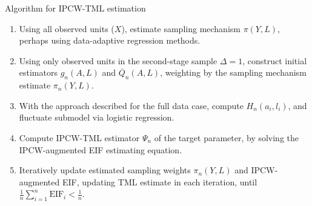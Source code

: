 \documentclass{beamer}
\begin{document}
\begin{frame}[c]{Algorithm for IPCW-TML estimation}

\begin{center}
\begin{enumerate}\label{ipcwtmle_algo}
  \itemsep8pt
  \item Using all observed units ($X$), estimate sampling mechanism
    $\pi(Y, L)$, perhaps using data-adaptive regression methods.
  \item Using only observed units in the second-stage sample $\Delta = 1$,
    construct initial estimators $g_n(A,L)$ and $\overline{Q}_n(A,L)$,
    weighting by the sampling mechanism estimate $\pi_n(Y,L)$.
  \item With the approach described for the full data case, compute
    $H_n(a_i,l_i)$, and fluctuate submodel via logistic regression.
  \item Compute IPCW-TML estimator $\Psi_n$ of the target parameter, by solving
    the IPCW-augmented EIF estimating equation.
  \item Iteratively update estimated sampling weights $\pi_n(Y,L)$ and
    IPCW-augmented EIF, updating TML estimate in each iteration, until
    $\frac{1}{n}\sum_{i = 1}^n \text{EIF}_i < \frac{1}{n}$.
\end{enumerate}
\end{center}


\end{frame}

\end{document}
